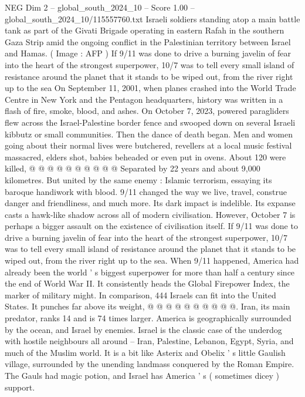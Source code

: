 \begin{textsample}{NEG Dim 2 – global\_south\_2024\_10 – Score 1.00 – global\_south\_2024\_10/115557760.txt}  \label{ex:f2_neg_422}
Israeli soldiers standing atop a main battle tank as part of the Givati Brigade operating in eastern Rafah in the southern Gaza Strip amid the ongoing conflict in the Palestinian territory between Israel and Hamas. ( Image : AFP ) If 9/11 was done to drive a burning javelin of fear into the heart of the strongest superpower, 10/7 was to tell every small island of resistance around the planet that it stands to be wiped out, from the river right up to the sea On September 11, 2001, when planes crashed into the World Trade Centre in New York and the Pentagon headquarters, history was written in a flash of fire, smoke, blood, and ashes.
On October 7, 2023, powered paragliders flew across the Israel-Palestine border fence and swooped down on several Israeli kibbutz or small communities.
Then the dance of death began.
Men and women going about their normal lives were butchered, revellers at a local music festival massacred, elders shot, babies beheaded or even put in ovens.
About 120 were killed, @ @ @ @ @ @ @ @ @ @ Separated by 22 years and about 9,000 kilometres.
But united by the same enemy : Islamic terrorism, essaying its baroque handiwork with blood. 9/11 changed the way we live, travel, construe danger and friendliness, and much more.
Its dark impact is indelible.
Its expanse casts a hawk-like shadow across all of modern civilisation.
However, October 7 is perhaps a bigger assault on the existence of civilisation itself.
If 9/11 was done to drive a burning javelin of fear into the heart of the strongest superpower, 10/7 was to tell every small island of resistance around the planet that it stands to be wiped out, from the river right up to the sea.
When 9/11 happened, America had already been the world ' s biggest superpower for more than half a century since the end of World War II.
It consistently heads the Global Firepower Index, the marker of military might.
In comparison, 444 Israels can fit into the United States.
It punches far above its weight, @ @ @ @ @ @ @ @ @ @.
Iran, its main predator, ranks 14 and is 74 times larger.
America is geographically surrounded by the ocean, and Israel by enemies.
Israel is the classic case of the underdog with hostile neighbours all around -- Iran, Palestine, Lebanon, Egypt, Syria, and much of the Muslim world.
It is a bit like Asterix and Obelix ' s little Gaulish village, surrounded by the unending landmass conquered by the Roman Empire.
The Gauls had magic potion, and Israel has America ' s ( sometimes dicey ) support.

\end{textsample}
